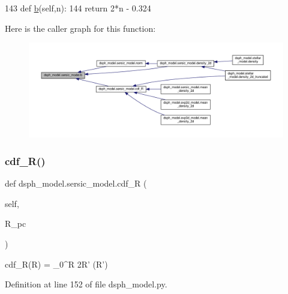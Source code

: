 \begin{DoxyCode}
143     \textcolor{keyword}{def }\hyperlink{namespacejfactor_a52f3e9e591dbe4f5d14f760a578cb15b}{b}(self,n):
144         \textcolor{keywordflow}{return} 2*n - 0.324
\end{DoxyCode}
Here is the caller graph for this function\+:\nopagebreak
\begin{figure}[H]
\begin{center}
\leavevmode
\includegraphics[width=350pt]{d0/de9/classdsph__model_1_1sersic__model_a13e1833567fab6c27dfc49cb80eab9a3_icgraph}
\end{center}
\end{figure}
\mbox{\label{classdsph__model_1_1sersic__model_a68a272af30ef7e30ddaa70b076dc2818}} 
\subsubsection{\texorpdfstring{cdf\+\_\+\+R()}{cdf\_R()}}
{\footnotesize\ttfamily def dsph\+\_\+model.\+sersic\+\_\+model.\+cdf\+\_\+R (\begin{DoxyParamCaption}\item[{}]{self,  }\item[{}]{R\+\_\+pc }\end{DoxyParamCaption})}

\begin{DoxyVerb}cdf_R(R) = \int_0^R  2\pi R' \Sigma(R')
\end{DoxyVerb}
 

Definition at line 152 of file dsph\+\_\+model.\+py.


